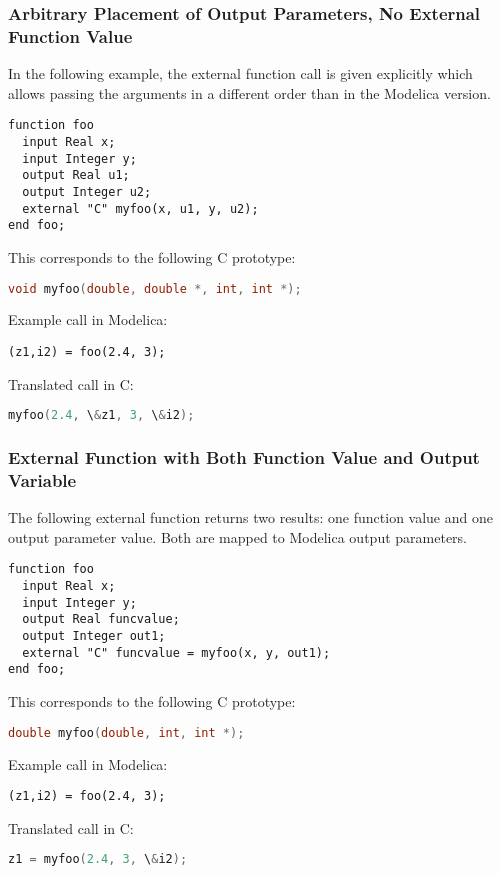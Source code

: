 \subsubsection{Arbitrary Placement of Output Parameters, No External Function Value}\label{arbitrary-placement-of-output-parameters-no-external-function-value}

\begin{example}
In the following example, the external function call is given
explicitly which allows passing the arguments in a different order than
in the Modelica version.
\begin{lstlisting}[language=modelica]
function foo
  input Real x;
  input Integer y;
  output Real u1;
  output Integer u2;
  external "C" myfoo(x, u1, y, u2);
end foo;
\end{lstlisting}
This corresponds to the following C prototype:
\begin{lstlisting}[language=C]
void myfoo(double, double *, int, int *);
\end{lstlisting}
Example call in Modelica:
\begin{lstlisting}[language=modelica]
(z1,i2) = foo(2.4, 3);
\end{lstlisting}
Translated call in C:
\begin{lstlisting}[language=C]
myfoo(2.4, \&z1, 3, \&i2);
\end{lstlisting}
\end{example}

\subsubsection{External Function with Both Function Value and Output Variable}\label{external-function-with-both-function-value-and-output-variable}

\begin{example}
The following external function returns two results: one
function value and one output parameter value. Both are mapped to
Modelica output parameters.
\begin{lstlisting}[language=modelica]
function foo
  input Real x;
  input Integer y;
  output Real funcvalue;
  output Integer out1;
  external "C" funcvalue = myfoo(x, y, out1);
end foo;
\end{lstlisting}
This corresponds to the following C prototype:
\begin{lstlisting}[language=C]
double myfoo(double, int, int *);
\end{lstlisting}
Example call in Modelica:
\begin{lstlisting}[language=modelica]
(z1,i2) = foo(2.4, 3);
\end{lstlisting}
Translated call in C:
\begin{lstlisting}[language=C]
z1 = myfoo(2.4, 3, \&i2);
\end{lstlisting}
\end{example}

